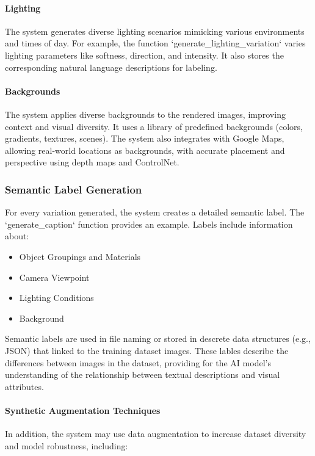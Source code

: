 \documentclass[12pt]{article}
\begin{document}
\paragraph{Lighting}
The system generates diverse lighting scenarios mimicking various environments and times of day. For example, the function `generate\_lighting\_variation` varies lighting parameters like softness, direction, and intensity. It also stores the corresponding natural language descriptions for labeling.

\paragraph{Backgrounds}
The system applies diverse backgrounds to the rendered images, improving context and visual diversity. It uses a library of predefined backgrounds (colors, gradients, textures, scenes). The system also integrates with Google Maps, allowing real-world locations as backgrounds, with accurate placement and perspective using depth maps and ControlNet.

\subsubsection{Semantic Label Generation}
For every variation generated, the system creates a detailed semantic label. The `generate\_caption` function provides an example. Labels include information about:

\begin{itemize}
    \item Object Groupings and Materials
    \item Camera Viewpoint
    \item Lighting Conditions
    \item Background
\end{itemize}

Semantic labels are used in file naming or stored in descrete data structures (e.g., JSON) that linked to the training dataset images. These lables describe the differences between images in the dataset, providing for the AI model's understanding of the relationship between textual descriptions and visual attributes.

\paragraph{Synthetic Augmentation Techniques}

In addition, the system may use data augmentation to increase dataset diversity and model robustness, including:
\end{document}

